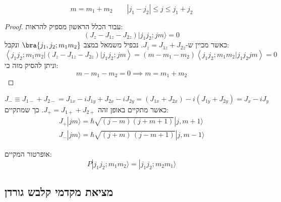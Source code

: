 \documentclass{tstextbook}
\begin{document}
\begin{proposition}
$$m=m_{1}+m_{2} \qquad |j_{1}-j_{2}|\leq j\leq j_{1}+j_{2}$$

\end{proposition}
\begin{proof}
עבור הכלל הראשון מספיק להראות:
$$\left(J_{z}-J_{1z}-J_{2z}\right)|j_{1}j_{2};j m\rangle=0$$
כאשר מכיין ש-\(J_{z}=J_{1z}+J_{2z}\). נכפיל משמאל במצב \(\bra{j_{1},j_{2};m_{1}m_{2}}\) ונקבל:
$$\left\langle j_{1}j_{2};m_{1}m_{2}|\left(J_{z}-J_{1z}-J_{2z}\right)|j_{1}j_{2};j m\right\rangle=\left(m-m_{1}-m_{2}\right)\left\langle j_{1}j_{2};m_{1}m_{2}|j_{1}j_{2}j m\right\rangle=0$$
וניתן להסיק מזה כי:
$$m-m_{1}-m_{2}=0\implies m=m_{1}+m_{2}$$

\end{proof}
\begin{proposition}
$$J_{-}\equiv J_{1-}+J_{2-}=J_{1x}-i J_{1y}+J_{2x}-i J_{2y}=(J_{1x}+J_{2x})-i\left(J_{1y}+J_{2y}\right)=J_{x}-i J_{y}$$
כאשר מתקיים באופן זהה \(J_{+}=J_{1+}+J_{2+}\). כך שמתקיים:
$$\begin{gather}J_{+}|j m\rangle=\hbar\sqrt{\left(j-m\right)\left(j+m+1\right)}|j,m+1\rangle\\ J_{-}|j m\rangle=\hbar\sqrt{(j+m)\,(j-m+1)}|j,m-1\rangle 
\end{gather}$$

\end{proposition}
\begin{proposition}
אופרטור המקיים:
$$P|j_{1}j_{2};m_{1}m_{2}\rangle=|j_{1}j_{2};m_{2}m_{1}\rangle$$

\end{proposition}
\subsection{מציאת מקדמי קלבש גורדן}
\end{document}
